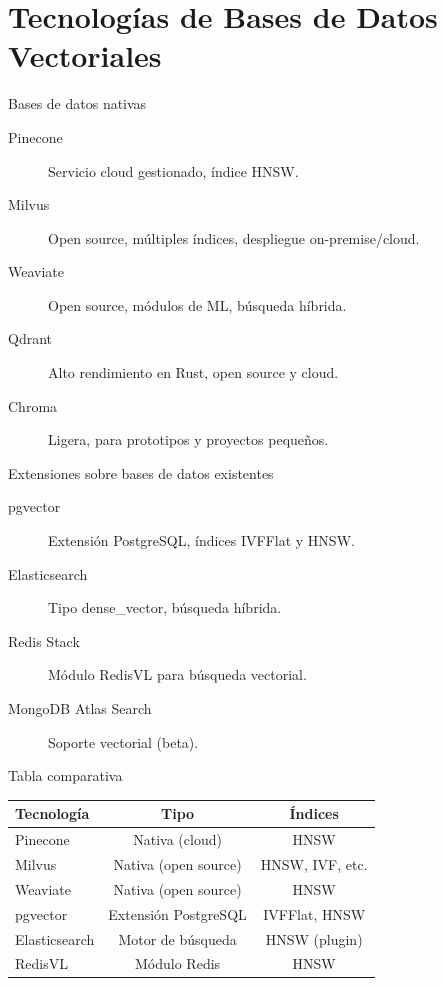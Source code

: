 \documentclass[aspectratio=169, 10pt, xcolor=table]{beamer}
\begin{document}
\section{Tecnologías de Bases de Datos Vectoriales}

\begin{frame}{Bases de datos nativas}
    \begin{description}
        \item[Pinecone] Servicio cloud gestionado, índice HNSW.
        \item[Milvus] Open source, múltiples índices, despliegue on-premise/cloud.
        \item[Weaviate] Open source, módulos de ML, búsqueda híbrida.
        \item[Qdrant] Alto rendimiento en Rust, open source y cloud.
        \item[Chroma] Ligera, para prototipos y proyectos pequeños.
    \end{description}
\end{frame}

\begin{frame}{Extensiones sobre bases de datos existentes}
    \begin{description}
        \item[pgvector] Extensión PostgreSQL, índices IVFFlat y HNSW.
        \item[Elasticsearch] Tipo dense\_vector, búsqueda híbrida.
        \item[Redis Stack] Módulo RedisVL para búsqueda vectorial.
        \item[MongoDB Atlas Search] Soporte vectorial (beta).
    \end{description}
\end{frame}

\begin{frame}{Tabla comparativa}
    \begin{table}
        \centering
        \begin{tabular}{l|c|c}
            \toprule
            Tecnología & Tipo & Índices \\
            \midrule
            Pinecone & Nativa (cloud) & HNSW \\
            Milvus & Nativa (open source) & HNSW, IVF, etc. \\
            Weaviate & Nativa (open source) & HNSW \\
            pgvector & Extensión PostgreSQL & IVFFlat, HNSW \\
            Elasticsearch & Motor de búsqueda & HNSW (plugin) \\
            RedisVL & Módulo Redis & HNSW \\
            \bottomrule
        \end{tabular}
    \end{table}
\end{frame}
\end{document}

